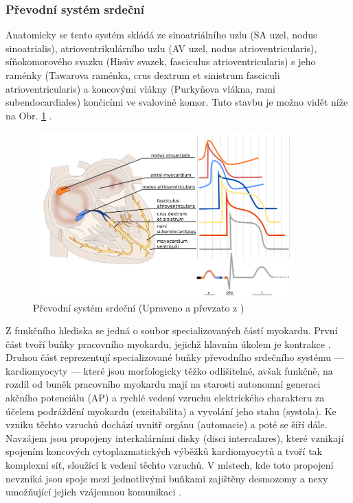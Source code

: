 \subsubsection{Převodní systém srdeční}
\label{section:pss}
Anatomicky se tento systém skládá ze sinoatriálního uzlu (SA uzel, nodus
sinoatrialis), atrioventrikulárního uzlu (AV uzel, nodus atrioventricularis),
síňokomorového svazku (Hisův svazek, fasciculus atrioventricularis) s jeho
raménky (Tawarova raménka, crus dextrum et sinistrum fasciculi
atrioventricularis) a koncovými vlákny (Purkyňova vlákna, rami subendocardiales)
končicími ve svalovině komor. Tuto stavbu je možno vidět níže na Obr.
\ref{fig:pss} \cite{Dylevsky2013}.

\begin{figure}[h]
	\begin{center}
		\includegraphics[width=0.9\textwidth]{../assets/anatomy/pss}
		\caption{Převodní systém srdeční (Upraveno a převzato z
			\cite{ecgpediaConduction})}
		\label{fig:pss}
	\end{center}
\end{figure}

Z funkčního hlediska se jedná o soubor specializovaných částí myokardu. První
část tvoří buňky pracovního myokardu, jejichž hlavním úkolem je kontrakce
\cite{Cihak2016}. Druhou část reprezentují specializované buňky převodního
srdečního systému --- kardiomyocyty --- které jsou morfologicky těžko
odlišitelné, avšak funkčně, na rozdíl od buněk pracovního myokardu mají na
starosti autonomní generaci akčního potenciálu (AP) a rychlé vedení vzruchu
elektrického charakteru za účelem podráždění myokardu (excitabilita) a vyvolání
jeho stahu (systola). Ke vzniku těchto vzruchů dochází uvnitř orgánu (automacie)
a poté se šíří dále. Navzájem jsou propojeny interkalárními disky (disci
intercalares), které vznikají spojením koncových cytoplazmatických výběžků
kardiomyocytů a tvoří tak komplexní síť, sloužící k vedení těchto vzruchů. V
místech, kde toto propojení nevzniká jsou spoje mezi jednotlivými buňkami
zajištěny desmozomy a nexy umožňující jejich vzájemnou komunikaci
\cite{Dylevsky2013, Stejfa2006}.

